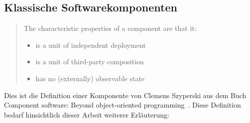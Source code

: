 \subsection{Klassische Softwarekomponenten}
\label{sec:2_Softwarekomponente_Klassisch}
\begin{quote}
\glqq The characteristic properties of a component are that it:\grqq
\begin{itemize}
\item is a unit of independent deployment
\item is a unit of third-party composition
\item has no (externally) observable state
\end{itemize}
\end{quote}

Dies ist die Definition einer Komponente von Clemens Szyperski aus dem Buch \glqq Component software: Beyond object-oriented programming\grqq\ \citereset \autocite[siehe][S. 35-38]{Szyperski.2002}.
Diese Definition bedarf hinsichtlich dieser Arbeit weiterer Erläuterung:
